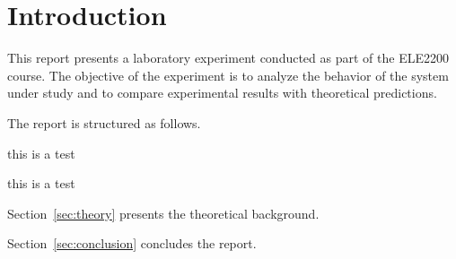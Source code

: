 \section{Introduction}

This report presents a laboratory experiment conducted as part of the ELE2200 course.
The objective of the experiment is to analyze the behavior of the system under study
and to compare experimental results with theoretical predictions.

The report is structured as follows.


this is a test

this is a test


Section~\ref{sec:theory} presents the theoretical background.

Section~\ref{sec:conclusion} concludes the report.